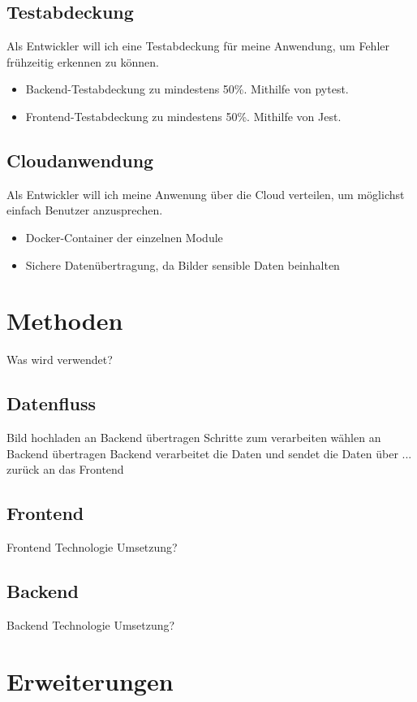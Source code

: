 \documentclass[conference]{IEEEtran}
\begin{document}
\subsection{Testabdeckung}
Als Entwickler will ich eine Testabdeckung für meine Anwendung, um Fehler frühzeitig erkennen zu können.
\begin{itemize}
	\item Backend-Testabdeckung zu mindestens 50\%. Mithilfe von pytest.
	\item Frontend-Testabdeckung zu mindestens 50\%. Mithilfe von Jest.
\end{itemize}

\subsection{Cloudanwendung}
Als Entwickler will ich meine Anwenung über die Cloud verteilen, um möglichst einfach Benutzer anzusprechen.
\begin{itemize}
	\item Docker-Container der einzelnen Module
	\item Sichere Datenübertragung, da Bilder sensible Daten beinhalten
\end{itemize}


\section{Methoden}
Was wird verwendet?

\subsection{Datenfluss}
Bild hochladen  an Backend übertragen
Schritte zum verarbeiten wählen an Backend übertragen
Backend verarbeitet die Daten und sendet die Daten über ... zurück an das Frontend

\subsection{Frontend}
Frontend Technologie
Umsetzung?

\subsection{Backend}
Backend Technologie
Umsetzung?

\section{Erweiterungen}
\end{document}
